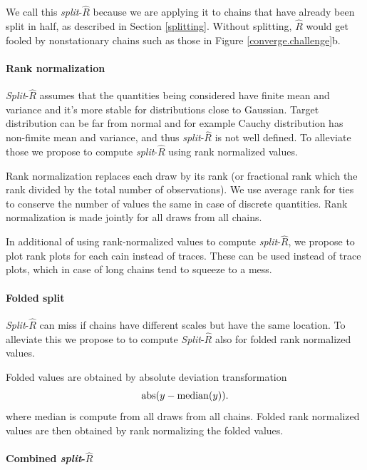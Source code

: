 \documentclass[11pt]{article}
\begin{document}
We call this {\em split}-$\widehat{R}$ because we are applying it to chains that have already been split in half, as described in Section \ref{splitting}.  Without splitting, $\widehat{R}$ would get fooled by nonstationary chains such as those in Figure \ref{converge.challenge}b.

\paragraph{Rank normalization}

{\em Split}-$\widehat{R}$ assumes that the quantities being considered
have finite mean and variance and it's more stable for distributions
close to Gaussian.  Target distribution can be far from normal and for
example Cauchy distribution has non-fimite mean and  variance,
and thus {\em split}-$\widehat{R}$ is not well defined. To alleviate
those we propose to compute {\em split}-$\widehat{R}$ using rank
normalized values.

Rank normalization replaces each draw by its rank (or fractional rank
which the rank divided by the total number of observations). We use
average rank for ties to conserve the number of values the same in
case of discrete quantities. Rank normalization is made jointly for
all draws from all chains.

In additional of using rank-normalized values to compute {\em
  split}-$\widehat{R}$, we propose to plot rank plots for each cain
instead of traces. These can be used instead of trace plots, which in
case of long chains tend to squeeze to a mess.

\paragraph{Folded split}

{\em Split}-$\widehat{R}$ can miss if chains have different scales but
have the same location. To alleviate this we propose to to compute
{\em Split}-$\widehat{R}$ also for folded rank normalized values.

Folded values are obtained by absolute deviation transformation
\begin{equation}
  {\rm abs}(y-{\rm median}(y)).
\end{equation}
where median is compute from all draws from all chains. Folded rank
normalized values are then obtained by rank normalizing the folded
values.

\paragraph{Combined {\em split}-$\widehat{R}$}
\end{document}
